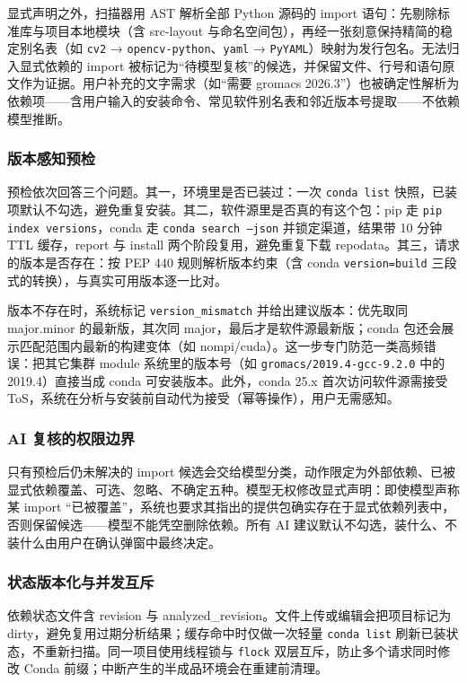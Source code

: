 \documentclass[UTF8,11pt,a4paper]{ctexart}
\newcommand{\code}[1]{\texttt{\small #1}}
\begin{document}
显式声明之外，扫描器用 AST 解析全部 Python 源码的 import 语句：先剔除标准库与项目本地模块（含 src-layout 与命名空间包），再经一张刻意保持精简的稳定别名表（如 \code{cv2} → \code{opencv-python}、\code{yaml} → \code{PyYAML}）映射为发行包名。无法归入显式依赖的 import 被标记为“待模型复核”的候选，并保留文件、行号和语句原文作为证据。用户补充的文字需求（如“需要 gromacs 2026.3”）也被确定性解析为依赖项——含用户输入的安装命令、常见软件别名表和邻近版本号提取——不依赖模型推断。

\subsubsection{版本感知预检}
预检依次回答三个问题。其一，环境里是否已装过：一次 \code{conda list} 快照，已装项默认不勾选，避免重复安装。其二，软件源里是否真的有这个包：pip 走 \code{pip index versions}，conda 走 \code{conda search --json} 并锁定渠道，结果带 10 分钟 TTL 缓存，report 与 install 两个阶段复用，避免重复下载 repodata。其三，请求的版本是否存在：按 PEP 440 规则解析版本约束（含 conda \code{version=build} 三段式的转换），与真实可用版本逐一比对。

版本不存在时，系统标记 \code{version\_mismatch} 并给出建议版本：优先取同 major.minor 的最新版，其次同 major，最后才是软件源最新版；conda 包还会展示匹配范围内最新的构建变体（如 nompi/cuda）。这一步专门防范一类高频错误：把其它集群 module 系统里的版本号（如 \code{gromacs/2019.4-gcc-9.2.0} 中的 2019.4）直接当成 conda 可安装版本。此外，conda 25.x 首次访问软件源需接受 ToS，系统在分析与安装前自动代为接受（幂等操作），用户无需感知。

\subsubsection{AI 复核的权限边界}
只有预检后仍未解决的 import 候选会交给模型分类，动作限定为外部依赖、已被显式依赖覆盖、可选、忽略、不确定五种。模型无权修改显式声明：即使模型声称某 import “已被覆盖”，系统也要求其指出的提供包确实存在于显式依赖列表中，否则保留候选——模型不能凭空删除依赖。所有 AI 建议默认不勾选，装什么、不装什么由用户在确认弹窗中最终决定。

\subsubsection{状态版本化与并发互斥}
依赖状态文件含 revision 与 analyzed\_revision。文件上传或编辑会把项目标记为 dirty，避免复用过期分析结果；缓存命中时仅做一次轻量 \code{conda list} 刷新已装状态，不重新扫描。同一项目使用线程锁与 \code{flock} 双层互斥，防止多个请求同时修改 Conda 前缀；中断产生的半成品环境会在重建前清理。
\end{document}
